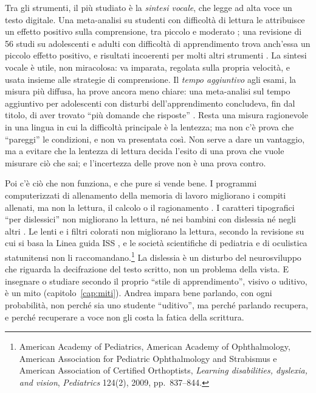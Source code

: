 Tra gli strumenti, il più studiato è la \emph{sintesi vocale}, che
legge ad alta voce un testo digitale. Una meta-analisi su studenti con
difficoltà di lettura le attribuisce un effetto positivo
sulla comprensione, tra piccolo e moderato \parencite{wood2018}; una
revisione di 56 studi su adolescenti e adulti con difficoltà di
apprendimento trova anch'essa un piccolo effetto positivo, e risultati incoerenti per
molti altri strumenti \parencite{perelmutter2017}. La sintesi vocale è
utile, non miracolosa: va imparata, regolata sulla propria velocità,
e usata insieme alle strategie di comprensione. Il \emph{tempo
aggiuntivo} agli esami, la misura più diffusa, ha prove ancora meno
chiare: una meta-analisi sul tempo aggiuntivo per adolescenti con disturbi dell'apprendimento concludeva, fin dal titolo, di aver
trovato \enquote{più domande che risposte} \parencite{gregg2012}. Resta una misura ragionevole in una lingua in cui la difficoltà principale è la lentezza; ma non c'è prova che \enquote{pareggi} le condizioni, e non va presentata così. Non serve a dare un vantaggio, ma a evitare che la lentezza di lettura decida l'esito di una prova che vuole misurare ciò che sai; e l'incertezza delle prove non è una prova contro.

Poi c'è ciò che non funziona, e che pure si vende bene. I programmi
computerizzati di allenamento della memoria di lavoro migliorano i
compiti allenati, ma non la lettura, il calcolo o il ragionamento
\parencite{melbylervag2016}. I caratteri tipografici \enquote{per
dislessici} non migliorano la lettura, né nei bambini con dislessia né
negli altri \parencite{kuster2018}. Le lenti
e i filtri colorati non migliorano la lettura, secondo la revisione su cui si basa la Linea guida ISS \parencite{iss2022}, e le società scientifiche di pediatria e di oculistica statunitensi non li raccomandano.\footnote{American Academy of Pediatrics, American Academy of Ophthalmology, American Association for Pediatric Ophthalmology and Strabismus e American Association of Certified Orthoptists, \emph{Learning disabilities, dyslexia, and vision}, \emph{Pediatrics} 124(2), 2009, pp.~837--844.} La dislessia è un disturbo del neurosviluppo che riguarda la decifrazione del testo scritto, non un problema della vista. E insegnare o studiare secondo il proprio
\enquote{stile di apprendimento}, visivo o uditivo, è un mito (capitolo~\ref{cap:miti}). Andrea impara bene parlando, con ogni probabilità, non perché sia uno studente \enquote{uditivo}, ma perché parlando recupera, e perché
recuperare a voce non gli costa la fatica della scrittura.

